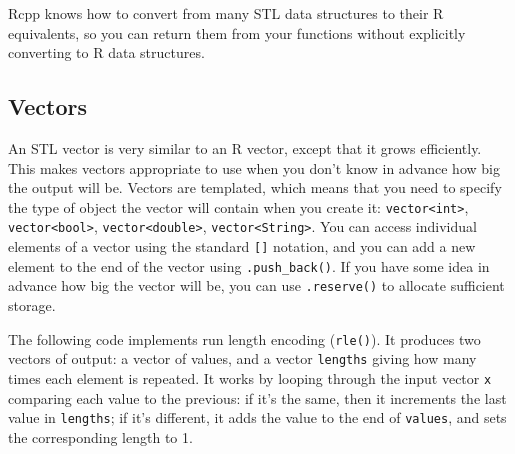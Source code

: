 Rcpp knows how to convert from many STL data structures to their R
equivalents, so you can return them from your functions without
explicitly converting to R data structures.

\hypertarget{vectors-stl}{%
\subsection{Vectors}\label{vectors-stl}}

An STL vector is very similar to an R vector, except that it grows
efficiently. This makes vectors appropriate to use when you don't know
in advance how big the output will be. Vectors are templated, which
means that you need to specify the type of object the vector will
contain when you create it: \texttt{vector\textless{}int\textgreater{}},
\texttt{vector\textless{}bool\textgreater{}},
\texttt{vector\textless{}double\textgreater{}},
\texttt{vector\textless{}String\textgreater{}}. You can access
individual elements of a vector using the standard \texttt{{[}{]}}
notation, and you can add a new element to the end of the vector using
\texttt{.push\_back()}. If you have some idea in advance how big the
vector will be, you can use \texttt{.reserve()} to allocate sufficient
storage. 

The following code implements run length encoding (\texttt{rle()}). It
produces two vectors of output: a vector of values, and a vector
\texttt{lengths} giving how many times each element is repeated. It
works by looping through the input vector \texttt{x} comparing each
value to the previous: if it's the same, then it increments the last
value in \texttt{lengths}; if it's different, it adds the value to the
end of \texttt{values}, and sets the corresponding length to 1.

